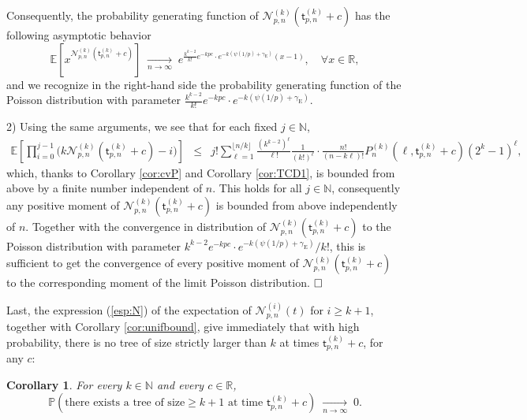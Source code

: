 \documentclass[a4, 11pt]{article}
\numberwithin{equation}{section}
\theoremstyle{plain}
\newtheorem{corollary}[theorem]{Corollary}
\theoremstyle{definition}
\theoremstyle{remark}
\begin{document}
Consequently, the probability generating function of $\mathcal N^{(k)}_{p,n}(\mathsf t^{(k)}_{p,n}+c)$ has the following asymptotic behavior
$$
\mathbb E\left[x^{\mathcal N^{(k)}_{p,n}(\mathsf t^{(k)}_{p,n}+c)} \right] \; \underset{n \rightarrow \infty} \longrightarrow \;  e^{\frac{k^{k-2}}{k!} e^{-kpc} \cdot e^{-k\left(\psi(1/p)+\gamma_{\mathrm E} \right)}(x-1)}, \quad \forall x \in \mathbb R,
$$
and we recognize in the right-hand side the probability generating function of the Poisson distribution with parameter $\frac{k^{k-2}}{k!} e^{-kpc} \cdot e^{-k\left(\psi(1/p)+\gamma_{\mathrm E} \right)}$.

\smallskip

2) Using the same arguments, we see that for each fixed $j \in \mathbb N$,
\begin{eqnarray*}
 \mathbb E\left[\prod_{i=0}^{j-1}\big(k \mathcal N_{p,n}^{(k)}(\mathsf t^{(k)}_{p,n}+c)-i\big) \right] &\leq& j! \sum_{\ell =1}^{\lfloor n/k\rfloor} \frac{ (k^{k-2})^{\ell}}{\ell !} \frac{1}{(k!)^{\ell}}  \cdot \frac{n!}{(n-k\ell)!}  P^{(k)}_n(\ell,\mathsf t^{(k)}_{p,n}+c) (2^{k}-1)^\ell,
\end{eqnarray*}
which, thanks to Corollary \ref{cor:cvP} and Corollary \ref{cor:TCD1}, is bounded from above by a finite number independent of $n$. This holds for all $j \in \mathbb N$, consequently any positive moment of $\mathcal N_{p,n}^{(k)}(\mathsf t^{(k)}_{p,n}+c)$ is bounded from above independently of $n$. Together with the convergence in distribution of $\mathcal N_{p,n}^{(k)}(\mathsf t^{(k)}_{p,n}+c)$ to the  Poisson distribution with parameter $k^{k-2}e^{-kpc} \cdot e^{-k\left(\psi(1/p)+\gamma_{\mathrm E} \right)}/k!$, this is sufficient to get the convergence of every positive moment of $\mathcal N_{p,n}^{(k)}(\mathsf t^{(k)}_{p,n}+c)$ to the corresponding moment of the limit Poisson distribution.
$\hfill \square$

\bigskip

Last, the expression (\ref{esp:N}) of the expectation of $\mathcal N_{p,n}^{(i)}(t)$ for $i \geq k+1$, together with Corollary \ref{cor:unifbound}, give immediately that with high probability, there is no tree of size strictly larger than $k$ at times $\mathsf t^{(k)}_{p,n}+c$, for any $c$: 


\begin{corollary} 
\label{cor:treesafterk}
For every $k \in \mathbb N$ and every $c \in \mathbb R$, 
$$\mathbb P\left(\text{there exists a tree of size}\geq k+1 \text{  at time } \mathsf t^{(k)}_{p,n} +c \right) \; \underset{n \rightarrow \infty} \longrightarrow \; 0.$$
\end{corollary}
\end{document}
